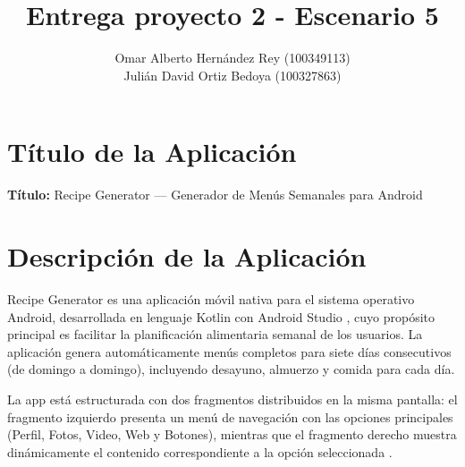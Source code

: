 \documentclass[stu, 12pt, letterpaper, donotrepeattitle, floatsintext, natbib]{apa7}
\title{Entrega proyecto 2 - Escenario 5}
\author{Omar Alberto Hernández Rey (100349113)\\
        Julián David Ortiz Bedoya (100327863) \vspace{0.8cm}}
\affiliation{\vspace{0.3cm}%
             Institución Universitaria Politécnico Grancolombiano\\
             Facultad de Ingeniería, Programa de Ingeniería de Software}
\begin{document}
\raggedbottom
\thispagestyle{fancy}
\maketitle


\renewcommand{\contentsname}{\large Índice}
\tableofcontents
\setcounter{tocdepth}{3}
\newpage

\renewcommand{\listfigurename}{\large Índice de figuras}
\listoffigures
\newpage

\renewcommand{\listtablename}{\large Índice de tablas}
\listoftables
\newpage



\section{Título de la Aplicación}

\noindent\textbf{Título:} Recipe Generator --- Generador de Menús Semanales para Android

\section{Descripción de la Aplicación}

Recipe Generator es una aplicación móvil nativa para el sistema operativo Android,
desarrollada en lenguaje Kotlin con Android Studio \citep{androiddevelopers2024fragments},
cuyo propósito principal es facilitar la planificación alimentaria semanal de los usuarios.
La aplicación genera automáticamente menús completos para siete días consecutivos
(de domingo a domingo), incluyendo desayuno, almuerzo y comida para cada día.

La app está estructurada con dos fragmentos distribuidos en la misma pantalla: el
fragmento izquierdo presenta un menú de navegación con las opciones principales (Perfil,
Fotos, Video, Web y Botones), mientras que el fragmento derecho muestra dinámicamente
el contenido correspondiente a la opción seleccionada \citep{androiddevelopers2024navigation}.
\end{document}
